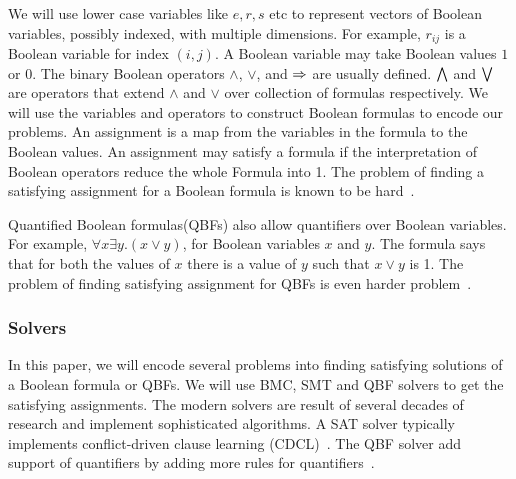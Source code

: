 \noindent We will use lower case variables like $e,r,s$ etc to represent vectors of
Boolean variables, possibly indexed, with multiple dimensions.
%
For example, $r_{ij}$ is a Boolean variable for index $(i,j)$.
%
%
A Boolean variable may take Boolean values $1$ or $0$.
%
The binary Boolean operators $\land$, $\lor$, and $\Rightarrow$ are usually defined.
%
$\bigwedge$ and $\bigvee$ are operators that extend $\land$ and $\lor$ over
collection of formulas respectively.
%
We will use the variables and operators to construct Boolean formulas to
encode our problems.
%
An assignment is a map from the variables in the formula to the Boolean values.
%
An assignment may satisfy a formula if the interpretation of Boolean operators
reduce the whole Formula into 1.
%
The problem of finding a satisfying assignment for a Boolean formula is known to be hard~\cite{cook1971complexity}.
%

Quantified Boolean formulas(QBFs) also allow quantifiers over Boolean variables.
%
For example, $\forall x \exists y. (x \lor y)$, for Boolean variables $x$ and $y$.
%
The formula says that for both the values of $x$ there is a value of $y$
such that $x \lor y$ is 1.
%
The problem of finding satisfying assignment for QBFs is even harder problem~\cite{arora2009computational}.\\
%

\subsubsection{Solvers}
In this paper, we will encode several problems into finding satisfying
solutions of a Boolean formula or QBFs.
%
We will use BMC, SMT and QBF solvers to get the satisfying assignments.
%
The modern solvers are result of several decades of research
and implement sophisticated algorithms.
%
A SAT solver typically implements conflict-driven clause learning (CDCL)~\cite{biere2009conflict}.
The QBF solver add support of quantifiers by adding more rules for quantifiers~\cite{buning2009theory}.

%
%

